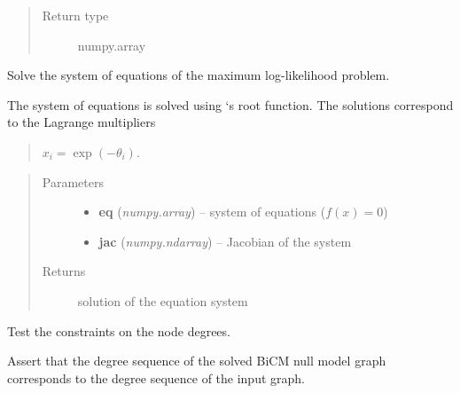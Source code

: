 \documentclass[letterpaper,10pt,english]{sphinxmanual}
\begin{document}
\begin{fulllineitems}
\begin{fulllineitems}
\begin{quote}
\begin{description}
\item[{Return type}] \leavevmode
numpy.array

\end{description}\end{quote}

\end{fulllineitems}


\begin{fulllineitems}
\label{source/src:src.bicm.BiCM.solve_equations}
Solve the system of equations of the maximum log-likelihood problem.

The system of equations is solved using `s root function. The
solutions correspond to the Lagrange multipliers
\begin{quote}

\(x_i = \exp(-\theta_i).\)
\end{quote}
\begin{quote}\begin{description}
\item[{Parameters}] \leavevmode\begin{itemize}
\item {} 
\textbf{eq} (\emph{numpy.array}) -- system of equations (\(f(x) = 0\))

\item {} 
\textbf{jac} (\emph{numpy.ndarray}) -- Jacobian of the system

\end{itemize}

\item[{Returns}] \leavevmode
solution of the equation system

\end{description}\end{quote}

\end{fulllineitems}


\begin{fulllineitems}
\label{source/src:src.bicm.BiCM.test_average_degrees}
Test the constraints on the node degrees.

Assert that the degree sequence of the solved BiCM null model graph
corresponds to the degree sequence of the input graph.


\end{fulllineitems}
\end{fulllineitems}
\end{document}
